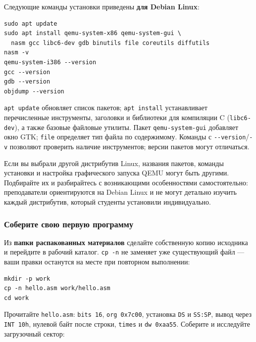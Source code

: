 Следующие команды установки приведены \textbf{для Debian Linux}:

\begin{verbatim}
sudo apt update
sudo apt install qemu-system-x86 qemu-system-gui \
  nasm gcc libc6-dev gdb binutils file coreutils diffutils
nasm -v
qemu-system-i386 --version
gcc --version
gdb --version
objdump --version
\end{verbatim}

\texttt{apt\ update} обновляет список пакетов; \texttt{apt\ install}
устанавливает перечисленные инструменты, заголовки и библиотеки для
компиляции C (\texttt{libc6-dev}), а также базовые файловые утилиты.
Пакет \texttt{qemu-system-gui} добавляет окно GTK; \texttt{file}
определяет тип файла по содержимому. Команды с
\texttt{-\/-version}/\texttt{-v} позволяют проверить наличие
инструментов; версии пакетов могут отличаться.

Если вы выбрали другой дистрибутив Linux, названия пакетов, команды
установки и настройка графического запуска QEMU могут быть другими.
Подбирайте их и разбирайтесь с возникающими особенностями
самостоятельно: преподаватели ориентируются на Debian Linux и не могут
детально изучить каждый дистрибутив, который студенты установили
индивидуально.

\hypertarget{ux441ux43eux431ux435ux440ux438ux442ux435-ux441ux432ux43eux44e-ux43fux435ux440ux432ux443ux44e-ux43fux440ux43eux433ux440ux430ux43cux43cux443}{%
\subsubsection{Соберите свою первую
программу}\label{ux441ux43eux431ux435ux440ux438ux442ux435-ux441ux432ux43eux44e-ux43fux435ux440ux432ux443ux44e-ux43fux440ux43eux433ux440ux430ux43cux43cux443}}

Из \textbf{папки распакованных материалов} сделайте собственную копию
исходника и перейдите в рабочий каталог. \texttt{cp\ -n} не заменяет уже
существующий файл --- ваши правки останутся на месте при повторном
выполнении:

\begin{verbatim}
mkdir -p work
cp -n hello.asm work/hello.asm
cd work
\end{verbatim}

Прочитайте \texttt{hello.asm}: \texttt{bits\ 16}, \texttt{org\ 0x7c00},
установка \texttt{DS} и \texttt{SS:SP}, вывод через \texttt{INT\ 10h},
нулевой байт после строки, \texttt{times} и \texttt{dw\ 0xaa55}.
Соберите и исследуйте загрузочный сектор:

